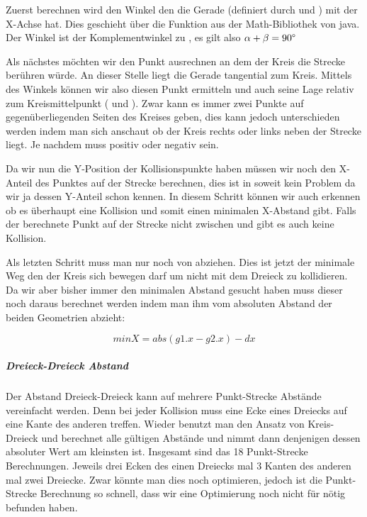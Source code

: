 
Zuerst berechnen wird den Winkel \textalpha den die Gerade (definiert durch  und ) mit der X-Achse hat. 
Dies geschieht über die Funktion  aus der Math-Bibliothek von java. 
Der Winkel \textbeta  ist der Komplementwinkel zu \textalpha, es gilt also $\alpha + \beta = 90\degree$


Als nächstes möchten wir den Punkt ausrechnen an dem der Kreis die Strecke berühren würde. An dieser Stelle liegt die Gerade tangential zum Kreis. Mittels des Winkels \textbeta  können wir also diesen Punkt ermitteln und auch seine Lage relativ zum Kreismittelpunkt ( und ).
Zwar kann es immer zwei Punkte auf gegenüberliegenden Seiten des Kreises geben, dies kann jedoch unterschieden werden indem man sich anschaut ob der Kreis rechts oder links neben der Strecke liegt. Je nachdem muss  positiv oder negativ sein.


Da wir nun die Y-Position der Kollisionspunkte haben müssen wir noch den X-Anteil des Punktes auf der Strecke berechnen, dies ist in soweit kein Problem da wir ja dessen Y-Anteil schon kennen. In diesem Schritt können wir auch erkennen ob es überhaupt eine Kollision und somit einen minimalen X-Abstand gibt. Falls der berechnete Punkt auf der Strecke nicht zwischen  und  gibt es auch keine Kollision.


Als letzten Schritt muss man nur noch  von  abziehen. Dies ist jetzt der minimale Weg den der Kreis sich bewegen darf um nicht mit dem Dreieck zu kollidieren. Da wir aber bisher immer den minimalen Abstand gesucht haben muss dieser noch daraus berechnet werden indem man ihm vom absoluten Abstand der beiden Geometrien abzieht:

$$minX = abs(g1.x - g2.x) - dx$$

\subparagraph{Dreieck-Dreieck Abstand}

Der Abstand Dreieck-Dreieck kann auf mehrere Punkt-Strecke Abstände vereinfacht werden. Denn bei jeder Kollision muss eine Ecke eines Dreiecks auf eine Kante des anderen treffen. Wieder benutzt man den Ansatz von Kreis-Dreieck und berechnet alle gültigen Abstände und nimmt dann denjenigen dessen absoluter Wert am kleinsten ist. Insgesamt sind das 18 Punkt-Strecke Berechnungen. Jeweils drei Ecken des einen Dreiecks mal 3 Kanten des anderen mal zwei Dreiecke. Zwar könnte man dies noch optimieren, jedoch ist die Punkt-Strecke Berechnung so schnell, dass wir eine Optimierung noch nicht für nötig befunden haben.

